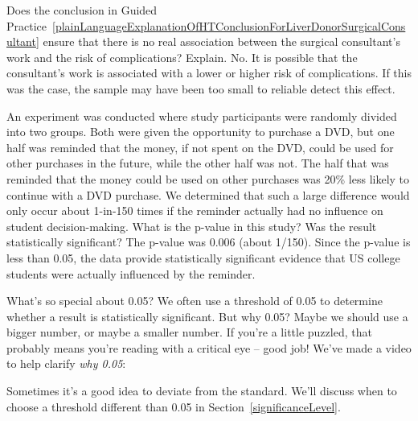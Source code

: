 \begin{examplewrap}
\begin{nexample}{Does the conclusion in Guided Practice~\ref{plainLanguageExplanationOfHTConclusionForLiverDonorSurgicalConsultant} ensure that there is no real association between the surgical consultant's work and the risk of complications? Explain.}
No. It is possible that the consultant's work is associated with a lower or higher risk of complications.
If this was the case, the sample may have been too small
to reliable detect this effect.
\end{nexample}
\end{examplewrap}




\begin{examplewrap}
\begin{nexample}{An experiment was conducted where study participants were randomly divided into two groups. Both were given the opportunity to purchase a DVD, but one half was reminded that the money, if not spent on the DVD, could be used for other purchases in the future, while the other half was not. The half that was reminded that the money could be used on other purchases was 20\% less likely to continue with a DVD purchase. We determined that such a large difference would only occur about 1-in-150 times if the reminder actually had no influence on student decision-making. What is the p-value in this study? Was the result statistically significant?}
The p-value was 0.006 (about 1/150). Since the p-value is less than 0.05, the data provide statistically significant evidence that US college students were actually influenced by the reminder.
\end{nexample}
\end{examplewrap}

\begin{onebox}{What's so special about 0.05?}
We often use a threshold of 0.05 to determine whether a result is statistically significant. But why 0.05? Maybe we should use a bigger number, or maybe a smaller number. If you're a little puzzled, that probably means you're reading with a critical eye -- good job! We've made a video to help clarify \emph{why 0.05}:
\begin{center}
\end{center}
Sometimes it's a good idea to deviate from the standard. We'll discuss when to choose a threshold different than 0.05 in Section~\ref{significanceLevel}.\vspace{0.5mm}\end{onebox}

